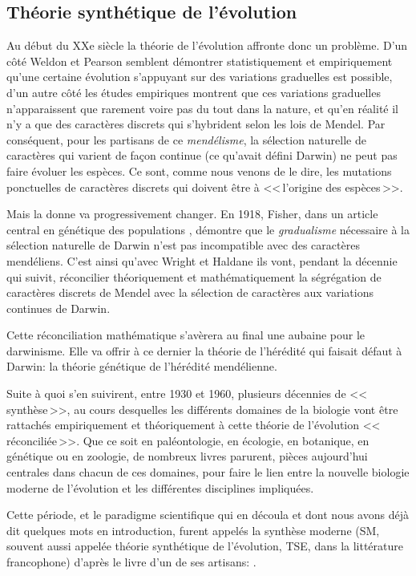 \subsection{Théorie synthétique de l'évolution}\label{sec:SM}
Au début du XXe siècle la théorie de l'évolution affronte donc un problème. D'un côté Weldon et Pearson semblent démontrer statistiquement et empiriquement qu'une certaine évolution s'appuyant sur des variations graduelles est possible, d'un autre côté les études empiriques montrent que ces variations graduelles n'apparaissent que rarement voire pas du tout dans la nature, et qu'en réalité il n'y a que des caractères discrets qui s'hybrident selon les lois de Mendel. Par conséquent, pour les partisans de ce \emph{mendélisme}, la sélection naturelle de caractères qui varient de façon continue (ce qu'avait défini Darwin) ne peut pas faire évoluer les espèces. Ce sont, comme nous venons de le dire, les mutations ponctuelles de caractères discrets qui doivent être à <<\,l'origine des espèces\,>>. 

Mais la donne va progressivement changer. En 1918, Fisher, dans un article central en génétique des populations \citep{fisher1918thecorrelationbetweenrelativesonthesuppositionofmendelianinheritance}, démontre que le \emph{gradualisme} nécessaire à la sélection naturelle de Darwin n'est pas incompatible avec des caractères mendéliens. C'est ainsi qu'avec Wright et Haldane ils vont, pendant la décennie qui suivit, réconcilier théoriquement et mathématiquement la ségrégation de caractères discrets de Mendel avec la sélection de caractères aux variations continues de Darwin. 

Cette réconciliation mathématique s'avèrera au final une aubaine pour le darwinisme. Elle va offrir à ce dernier la théorie de l'hérédité qui faisait défaut à Darwin: la théorie génétique de l'hérédité mendélienne.

Suite à quoi s'en suivirent, entre 1930 et 1960, plusieurs décennies de <<\,synthèse\,>>, au cours desquelles les différents domaines de la biologie vont être rattachés empiriquement et théoriquement à cette théorie de l'évolution <<\,réconciliée\,>>. Que ce soit en paléontologie, en écologie, en botanique, en génétique ou en zoologie, de nombreux livres parurent, pièces aujourd'hui centrales dans chacun de ces domaines, pour faire le lien entre la nouvelle biologie moderne de l'évolution et les différentes disciplines impliquées.

Cette période, et le paradigme scientifique qui en découla et dont nous avons déjà dit quelques mots en introduction, furent appelés la synthèse moderne (SM, souvent aussi appelée théorie synthétique de l'évolution, TSE, dans la littérature francophone) d'après le livre d'un de ses artisans: \cite{huxley1942evolution}. 

